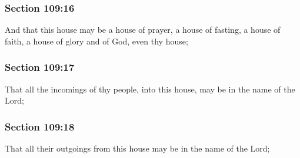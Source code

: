 
	\subsubsection{Section 109:16} %
		\label{DC109-16}

		And that this house may be a house of prayer, a house of fasting, a house of faith, a house of glory and of God, even thy house;


	\subsubsection{Section 109:17} %
		\label{DC109-17}

		That all the incomings of thy people, into this house, may be in the name of the Lord;


	\subsubsection{Section 109:18} %
		\label{DC109-18}

		That all their outgoings from this house may be in the name of the Lord;

